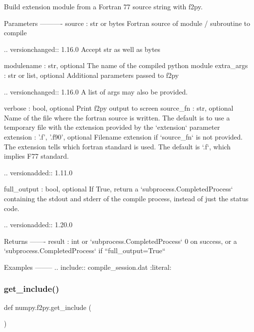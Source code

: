 \begin{DoxyVerb}Build extension module from a Fortran 77 source string with f2py.

Parameters
----------
source : str or bytes
    Fortran source of module / subroutine to compile

    .. versionchanged:: 1.16.0
       Accept str as well as bytes

modulename : str, optional
    The name of the compiled python module
extra_args : str or list, optional
    Additional parameters passed to f2py

    .. versionchanged:: 1.16.0
        A list of args may also be provided.

verbose : bool, optional
    Print f2py output to screen
source_fn : str, optional
    Name of the file where the fortran source is written.
    The default is to use a temporary file with the extension
    provided by the `extension` parameter
extension : {'.f', '.f90'}, optional
    Filename extension if `source_fn` is not provided.
    The extension tells which fortran standard is used.
    The default is `.f`, which implies F77 standard.

    .. versionadded:: 1.11.0

full_output : bool, optional
    If True, return a `subprocess.CompletedProcess` containing
    the stdout and stderr of the compile process, instead of just
    the status code.

    .. versionadded:: 1.20.0


Returns
-------
result : int or `subprocess.CompletedProcess`
    0 on success, or a `subprocess.CompletedProcess` if
    ``full_output=True``

Examples
--------
.. include:: compile_session.dat
    :literal:\end{DoxyVerb}
 \mbox{\label{namespacenumpy_1_1f2py_a86217766518812d31ed0d0d013e34f44}} 
\subsubsection{\texorpdfstring{get\+\_\+include()}{get\_include()}}
{\footnotesize\ttfamily def numpy.\+f2py.\+get\+\_\+include (\begin{DoxyParamCaption}{ }\end{DoxyParamCaption})}

